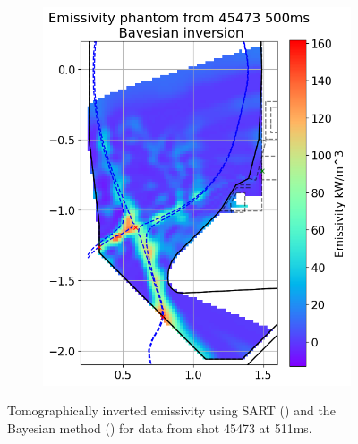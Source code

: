 \begin{figure}[!ht]
\begin{subfigure}{0.49\linewidth}
         \includegraphics[trim={10 5 0 43},clip,width=\textwidth]{Chapters/chapter2/figs/inversion_comparison_emissivity_real_data_test-Bayes.png}
         \caption{}
         \label{fig:real_phantom2b}
     \end{subfigure}
    \caption{Tomographically inverted emissivity using SART () and the Bayesian method () for data from shot 45473 at 511ms.}
    \label{fig:real_phantom2}
\end{figure}
